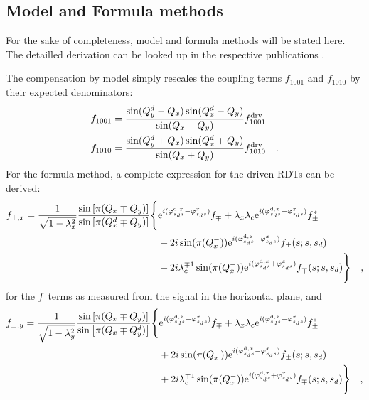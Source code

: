 \subsection{Model and Formula methods}

For the sake of completeness, model and formula methods will be stated here. The detailled derivation
can be looked up in the respective publications \cite{Miyamoto2008}.

The compensation by model simply rescales the coupling terms $f_{1001}$ and $f_{1010}$ by their expected
denominators:
%
\begin{align}
    f_{1001} &= \frac{\sin(Q^{d}_{y} - Q_x) \sin(Q^{d}_{x} - Q_y)}{\sin(Q_x-Q_y)}f_{1001}^\text{drv}
    \notag \\
    f_{1010} &= \frac{\sin(Q^{d}_{y} + Q_x) \sin(Q^{d}_{x} + Q_y)}{\sin(Q_x+Q_y)}f_{1010}^\text{drv}
    \quad .
\end{align}
%
For the formula method, a complete expression for the driven RDTs can be derived:
%
\begin{align}
    f_{\pm,x} = \frac{1}{\sqrt{1-\lambda_x^2}}
        \frac{
            \sin\left[\pi(Q_x\mp Q_y)\right]
        }{
            \sin\left[\pi(Q^{d}_{x}\mp Q_y)\right]
        }
        \Bigg\{&
        \text{e}^{i(\varphi_{s_ds}^{\text{d},x} - \varphi_{s_ds}^{x} )} f_{\mp}
        +\lambda_x \lambda_c \text{e}^{i(\varphi_{s_ds}^{\text{d},x} - \varphi_{s_ds}^{x} )}f_{\pm}^*
        \notag \\
        & +2i \sin(\pi(Q_x^-))\text{e}^{i(\varphi_{s_ds}^{\text{d},x} - \varphi_{s_ds}^{x} )}f_{\pm}(s;s,s_d)
        \notag \\
        & +2i \lambda_c^{\mp 1} \sin(\pi(Q_x^-))\text{e}^{i(\varphi_{s_ds}^{\text{d},x} + \varphi_{s_ds}^{x} )}f_{\mp}(s;s,s_d)
        \Bigg\}
        \quad ,
\end{align}
%
for the $f$~terms as measured from the signal in the horizontal plane, and
%
\begin{align}
    f_{\pm,y} = \frac{1}{\sqrt{1-\lambda_y^2}}
        \frac{
            \sin\left[\pi(Q_x\mp Q_y)\right]
        }{
            \sin\left[\pi(Q_x\mp Q^{d}_{y})\right]
        }
        \Bigg\{&
        \text{e}^{i(\varphi_{s_ds}^{\text{d},x} - \varphi_{s_ds}^{x} )} f_{\mp}
        +\lambda_x \lambda_c \text{e}^{i(\varphi_{s_ds}^{\text{d},x} - \varphi_{s_ds}^{x} )}f_{\pm}^*
        \notag \\
        & +2i \sin(\pi(Q_x^-))\text{e}^{i(\varphi_{s_ds}^{\text{d},x} - \varphi_{s_ds}^{x} )}f_{\pm}(s;s,s_d)
        \notag \\
        & +2i \lambda_c^{\mp 1} \sin(\pi(Q_x^-))\text{e}^{i(\varphi_{s_ds}^{\text{d},x} + \varphi_{s_ds}^{x} )}f_{\mp}(s;s,s_d)
        \Bigg\}
        \quad ,
        \label{eq_drv_cpl_f_ryo}
\end{align}
